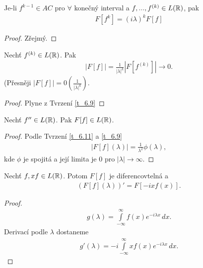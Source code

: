 \begin{tvrz}\label{t_6.11}
Je-li $f^{k-1} \in AC$ pro $\forall$ konečný interval a $f,...,f^{(k)} \in L(\mathbb{R})$, pak
\begin{align*}
F[f^{k}]=(i \lambda)^k F[f]
\end{align*}
\end{tvrz}
\begin{proof}
Zřejmý.
\end{proof}

\begin{tvrz}\label{t_6.12}
Nechť $f^{(k)} \in L(\mathbb{R})$. Pak
\begin{align*}
|F[f]|=\frac{1}{|\lambda|^k}|F[f^{(k)}]|\to 0.
\end{align*}
(Přesněji $|F[f]|=0(\frac{1}{|\lambda|^k})$.
\end{tvrz}

\begin{proof}
Plyne z Tvrzení \ref{t_6.9}
\end{proof}

\begin{tvrz}
Nechť $f'' \in L(\mathbb{R})$. Pak $F[f] \in L(\mathbb{R})$.
\end{tvrz}

\begin{proof}
Podle Tvrzení \ref{t_6.11} a \ref{t_6.9}
\begin{align*}
|F[f](\lambda)|=\frac{1}{\lambda^2} \phi(\lambda),
\end{align*}
kde $\phi$ je spojitá a její limita je $0$ pro $|\lambda | \to \infty.$
\end{proof}

\begin{tvrz}
Nechť $f,xf \in L(\mathbb{R})$. Potom $F[f]$ je diferencovtelná a 
\begin{align*}
(F[f](\lambda))'=F[-ixf(x)].
\end{align*}
\end{tvrz}
\begin{proof}

\begin{align*}
g(\lambda)= \int \limits _{-\infty}^{\infty} f(x) e^{-i \lambda x} \, dx.
\end{align*}
Derivací podle $\lambda$ dostaneme
\begin{align*}
g'(\lambda)= -i \int \limits _{-\infty}^{\infty} xf(x) e^{-i \lambda x} \, dx.
\end{align*}

\end{proof}

